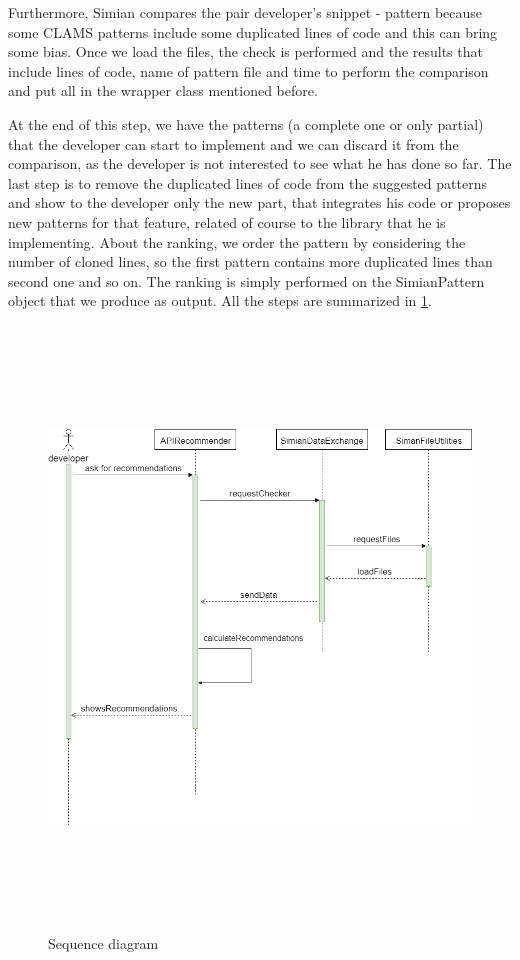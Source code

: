 Furthermore, Simian compares the pair developer's snippet - pattern because some CLAMS patterns include some duplicated lines of code and this can bring some bias. Once we load the files, the check is performed and the results that include lines of code, name of pattern file and time to perform the comparison and put all in the wrapper class mentioned before.

At the end of this step, we have the patterns (a complete one or only partial) that the developer can start to implement and we can discard it from the comparison, as the developer is not interested to see what he has done so far. The last step is to remove the duplicated lines of code from the suggested patterns and show to the developer only the new part, that integrates his code or proposes new patterns for that feature, related of course to the library that he is implementing. About the ranking, we order the pattern by considering the number of cloned lines, so the first pattern contains more duplicated lines than second one and so on. The ranking is simply performed on the SimianPattern object that we produce as output. All the steps are summarized in \ref{fig:SequenceDiagram}.


\begin{figure}[!h]
	\includegraphics[width=14cm,height=16cm,keepaspectratio]{images/Sequence.png}
	\centering
	\caption{Sequence diagram }
	\label{fig:SequenceDiagram}
\end{figure}


